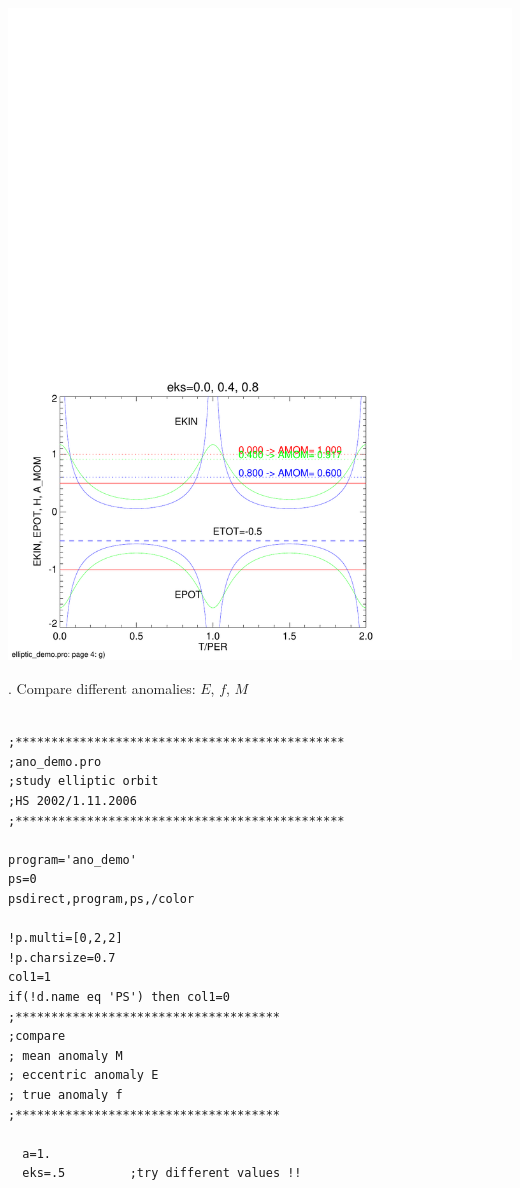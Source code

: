 \documentclass[a4paper,12pt]{article}
\def\red{\color{red}}
\def\black{\color{RGBblack}}
\begin{document}
{{{{\includegraphics[width=0.9\paperwidth,height=1\paperheight]{elliptic_demo_4.pdf}

\clearpage
\newpage
\black

{. Compare different anomalies: $E$, $f$, $M$} \ \small {}


{\red \scriptsize \begin{verbatim}

;**********************************************
;ano_demo.pro
;study elliptic orbit
;HS 2002/1.11.2006
;**********************************************

program='ano_demo'
ps=0
psdirect,program,ps,/color

!p.multi=[0,2,2]
!p.charsize=0.7
col1=1
if(!d.name eq 'PS') then col1=0
;*************************************
;compare 
; mean anomaly M
; eccentric anomaly E
; true anomaly f
;*************************************

  a=1.
  eks=.5         ;try different values !!
  

\end{verbatim}}}}}}
\end{document}
